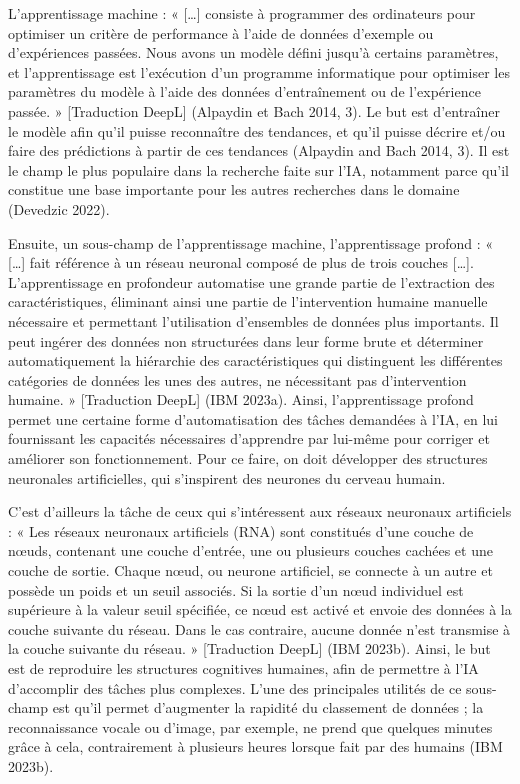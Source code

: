\documentclass[
  letterpaper,
]{scrbook}
\begin{document}
L'apprentissage machine : « {[}\ldots{]} consiste à programmer des
ordinateurs pour optimiser un critère de performance à l'aide de données
d'exemple ou d'expériences passées. Nous avons un modèle défini jusqu'à
certains paramètres, et l'apprentissage est l'exécution d'un programme
informatique pour optimiser les paramètres du modèle à l'aide des
données d'entraînement ou de l'expérience passée. » {[}Traduction
DeepL{]} (Alpaydin et Bach 2014, 3). Le but est d'entraîner le modèle
afin qu'il puisse reconnaître des tendances, et qu'il puisse décrire
et/ou faire des prédictions à partir de ces tendances (Alpaydin and Bach
2014, 3). Il est le champ le plus populaire dans la recherche faite sur
l'IA, notamment parce qu'il constitue une base importante pour les
autres recherches dans le domaine (Devedzic 2022).

Ensuite, un sous-champ de l'apprentissage machine, l'apprentissage
profond : « {[}\ldots{]} fait référence à un réseau neuronal composé de
plus de trois couches {[}\ldots{]}. L'apprentissage en profondeur
automatise une grande partie de l'extraction des caractéristiques,
éliminant ainsi une partie de l'intervention humaine manuelle nécessaire
et permettant l'utilisation d'ensembles de données plus importants. Il
peut ingérer des données non structurées dans leur forme brute et
déterminer automatiquement la hiérarchie des caractéristiques qui
distinguent les différentes catégories de données les unes des autres,
ne nécessitant pas d'intervention humaine. » {[}Traduction DeepL{]} (IBM
2023a). Ainsi, l'apprentissage profond permet une certaine forme
d'automatisation des tâches demandées à l'IA, en lui fournissant les
capacités nécessaires d'apprendre par lui-même pour corriger et
améliorer son fonctionnement. Pour ce faire, on doit développer des
structures neuronales artificielles, qui s'inspirent des neurones du
cerveau humain.

C'est d'ailleurs la tâche de ceux qui s'intéressent aux réseaux
neuronaux artificiels : « Les réseaux neuronaux artificiels (RNA) sont
constitués d'une couche de nœuds, contenant une couche d'entrée, une ou
plusieurs couches cachées et une couche de sortie. Chaque nœud, ou
neurone artificiel, se connecte à un autre et possède un poids et un
seuil associés. Si la sortie d'un nœud individuel est supérieure à la
valeur seuil spécifiée, ce nœud est activé et envoie des données à la
couche suivante du réseau. Dans le cas contraire, aucune donnée n'est
transmise à la couche suivante du réseau. » {[}Traduction DeepL{]} (IBM
2023b). Ainsi, le but est de reproduire les structures cognitives
humaines, afin de permettre à l'IA d'accomplir des tâches plus
complexes. L'une des principales utilités de ce sous-champ est qu'il
permet d'augmenter la rapidité du classement de données ; la
reconnaissance vocale ou d'image, par exemple, ne prend que quelques
minutes grâce à cela, contrairement à plusieurs heures lorsque fait par
des humains (IBM 2023b).
\end{document}
